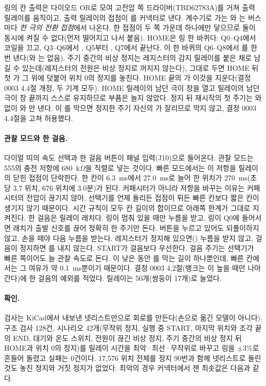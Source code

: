 링의 칸 출력은 다이오드 OR로 모여 고전압 쪽 드라이버(TBD62783A)를 거쳐 출력 릴레이를 움직이고, 출력 릴레이의 접점이
를 커넥터로 낸다. 계수기로 가는 와 는 버스마다 \emph{한 극의 전환 접점}에서 나온다.
한 접점이 두 쪽 가운데 하나에만 닿으므로 둘이 동시에 켜질 수 없다(먼저 떨어지고 나서 붙음). HOME은 링 한 바퀴다:
Q0--Q4에서 코일을 끄고, Q3--Q6에서 , Q5부터 , Q7에서 끝난다. 이 한 바퀴의 Q6--Q8에서
를 한 번 낸다(와 는 없음). 주기 중간의 비상 정지는 레지스터의 감지 릴레이를
붙은 채로 남길 수 있는데(레지스터의 전원은 비상 정지로 꺼지지 않는다), 그대로 두면 HOME 뒤 첫 가 그 위에
덧붙어 위치 0의 정지를 놓친다. HOME 끝의 가 이것을 지운다(결정 0003 4.4절 개정, 두 기계 모두).
HOME 릴레이의 남던 극이  창을 열고  릴레이의 남던 극이 창 끝까지 스스로 유지하므로 부품은
늘지 않았다. 정지 뒤 재시작의 첫 주기는 와  없이 와 만 낸다. 이
를 막으면 정지한 주기 자신의 가 잘리므로 막지 않고, 결정 0003 4.4절을 고쳐 허용했다.

\paragraph{관찰 모드와 한 걸음.} 다이얼 띠의 속도 선택과 한 걸음 버튼이 패널 입력(J10)으로 들어온다. 관찰 모드는 555의
충전 저항에 680~k$\Omega$을 직렬로 넣는 것이다. 빠른 모드에서는 이 저항을 릴레이의 닫힌 접점이 단락한다. 한 칸이
6.3~ms에서 27.0~ms로 늘어 한 위치가 270~ms(초당 3.7 위치, 676 위치에 3.0분)가 된다. 커패시터가 아니라 저항을 바꾸는
이유는 커패시터의 전압이 끊기지 않아, 선택기를 언제 돌리든 접점이 튀든 빠른 칸보다 짧은 칸이 생기지 않기 때문이다.
시간 규칙이 모두 칸 길이의 합이므로 아래쪽 한계가 그대로 지켜진다. 한 걸음은 릴레이 래치다. 링이 멈춰 있을 때만 누름을
받고, 링이 Q0에 들어서면 래치가 출발 신호를 끊어 정확히 한 주기만 돈다. 버튼을 누르고 있어도 되풀이하지 않고, 손을 떼야
다음 누름을 받는다. 레지스터가 정지해 있으면() 누름을 받지 않고, 걸음이 정지하면 를 내지
않는다. START가 걸음보다 우선한다. 걸음 주기는 선택기가 빠른 쪽이어도 늘 관찰 속도로 돈다. 이 낮은 동안
를 막는 길이  하나뿐인데, 빠른 칸에서는 그 여유가 약 0.1~ms뿐이기 때문이다. 결정 0003
4.2절(뱅크는 이 높을 때만 나아간다)에 한 걸음의 예외를 적었다. 릴레이는 50개(쌍둥이 17개)로 늘었다.

\paragraph{확인.} 검사는 KiCad에서 내보낸 넷리스트만으로 회로를 만든다(손으로 옮긴 모델이 아니다). 구조 검사 128건,
시나리오 42개(무작위 정지, 실행 중 START, 마지막 위치와 조각 끝의 END, 대기와 온도 스위치, 전원이 끊긴 비상 정지,
주기 중간의 비상 정지 뒤 HOME과 위치 0의 정지)를
릴레이 시간을 최악·최선·무작위로 바꾸고 링을 $\pm 3$\%로 흔들어 돌렸고 실패는 0건이다. 17,576 위치 전체를 정지 90번과
함께 넷리스트로 돌린 것도 놓친 정지와 거짓 정지가 없었다. 최악의 경우 커넥터에서 잰 최솟값은 다음과 같다.

